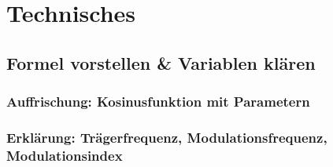 \section{Technisches}

\subsection{Formel vorstellen \& Variablen klären}
\subsubsection{Auffrischung: Kosinusfunktion mit Parametern}
\subsubsection{Erklärung: Trägerfrequenz, Modulationsfrequenz, Modulationsindex}